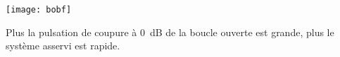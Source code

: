 \begin{marginfigure}
\centering
\texttt{[image: bobf]}
\end{marginfigure}

\begin{resultat}
Plus la pulsation de coupure à \SI{0}{dB} de la boucle ouverte est grande, plus le système asservi est rapide.
\end{resultat}







